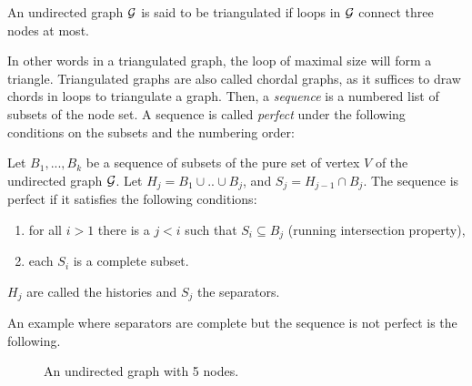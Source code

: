  \begin{definition}
 An undirected graph $\mathcal{G}$ is said to be triangulated if loops in $\mathcal{G}$ connect three nodes at most.
 \end{definition} 
 In other words in a triangulated graph, the loop of maximal size will form a triangle. Triangulated graphs are also called chordal graphs, as it suffices to draw chords in loops to triangulate a graph. Then, a \textit{sequence} is a numbered list of subsets of the node set. A sequence is called \textit{perfect} under the following conditions on the subsets and the numbering order:
 \begin{definition}\label{def:seq}
 Let $B_1,...,B_k$ be a sequence of subsets of the pure set of vertex $V$ of the undirected graph $\mathcal{G}$. Let $H_j=B_1\cup .. \cup B_j$, and $S_j = H_{j-1} \cap B_j$. The sequence is perfect if it satisfies the following conditions:
 \begin{enumerate}[label=(\roman*)]
 \item for all $i>1$ there is a $j<i$ such that $S_i \subseteq B_j$ (running intersection property),
 \item each $S_i$ is a complete subset.
 \end{enumerate}
 $H_j$ are called the histories and $S_j$ the separators.
 \end{definition}
 An example where separators are complete but the sequence is not perfect is the following.
\begin{figure}[H]
 \begin{center}
 \caption{An undirected graph with 5 nodes.}
  \label{ex:graph1}
    \end{center}
\end{figure}
